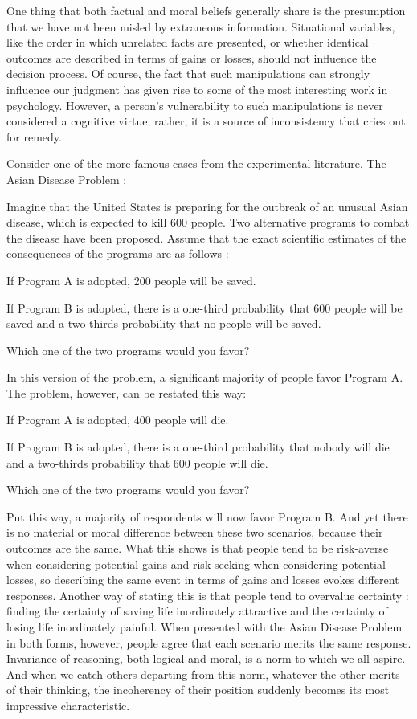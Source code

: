 \documentclass[a4paper,14pt]{extbook}
\begin{document}
One thing that both factual and moral beliefs generally share is the presumption that we have not been misled by extraneous information.
Situational variables, like the order in which unrelated facts are presented, or whether identical outcomes are described in terms of gains or losses, should not influence the decision process.
Of course, the fact that such manipulations can strongly influence our judgment has given rise to some of the most interesting work in psychology.
However, a person’s vulnerability to such manipulations is never considered a cognitive virtue;
rather, it is a source of inconsistency that cries out for remedy.

Consider one of the more famous cases from the experimental literature, The Asian Disease Problem :

Imagine that the United States is preparing for the outbreak of an unusual Asian disease, which is expected to kill 600 people.
Two alternative programs to combat the disease have been proposed.
Assume that the exact scientific estimates of the consequences of the programs are as follows :

If Program A is adopted, 200 people will be saved.

If Program B is adopted, there is a one-third probability that 600 people will be saved and a two-thirds probability that no people will be saved.

Which one of the two programs would you favor?

In this version of the problem, a significant majority of people favor Program A.
The problem, however, can be restated this way:

If Program A is adopted, 400 people will die.

If Program B is adopted, there is a one-third probability that nobody will die and a two-thirds probability that 600 people will die.

Which one of the two programs would you favor?

Put this way, a majority of respondents will now favor Program B.
And yet there is no material or moral difference between these two scenarios, because their outcomes are the same.
What this shows is that people tend to be risk-averse when considering potential gains and risk seeking when considering potential losses, so describing the same event in terms of gains and losses evokes different responses.
Another way of stating this is that people tend to overvalue certainty :
finding the certainty of saving life inordinately attractive and the certainty of losing life inordinately painful.
When presented with the Asian Disease Problem in both forms, however, people agree that each scenario merits the same response.
Invariance of reasoning, both logical and moral, is a norm to which we all aspire.
And when we catch others departing from this norm, whatever the other merits of their thinking, the incoherency of their position suddenly becomes its most impressive characteristic.
\end{document}
